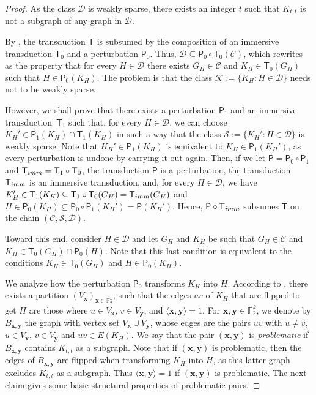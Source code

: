 \documentclass[10pt,a4paper]{amsart}
\newcommand{\Cc}{\mathscr{C}}
\newcommand{\Dd}{\mathscr{D}}
\newcommand{\Ss}{\mathscr{S}}
\begin{document}
\begin{proof}
	As the class $\Dd$ is weakly sparse, there exists an integer $t$ such that $K_{t,t}$ is not a subgraph of any graph in $\Dd$.
	
	By , the transduction $\mathsf T$ is subsumed by the composition of an immersive transduction $\mathsf T_0$ and a perturbation $\mathsf P_0$.
	Thus, $\Dd\subseteq \mathsf P_0\circ\mathsf T_0(\Cc)$, which rewrites as the property that for every $H\in\Dd$ there exists $G_H\in\Cc$ and $K_H\in\mathsf T_0(G_H)$ such that
	$H\in \mathsf P_0(K_H)$. 
	The problem is that the class $\mathscr K:=\{K_H\colon H\in\Dd\}$ needs not to be weakly sparse.
	
	However, we shall prove that there exists a perturbation $\mathsf P_1$ and an immersive transduction~$\mathsf T_1$ such that, for every $H\in\Dd$, we can choose 
	$K_H'\in\mathsf P_1(K_H)\cap \mathsf T_1(K_H)$ in such a way that the class 
	$\Ss:=\{K_H'\colon H\in\Dd\}$ is weakly sparse.
	Note that $K_H'\in\mathsf P_1(K_H)$ is equivalent to $K_H\in\mathsf P_1(K_H')$, as every perturbation is undone by carrying it out again.
	Then, if we let $\mathsf P=\mathsf P_0\circ\mathsf P_1$ and $\mathsf T_{\rm imm}=\mathsf T_1\circ\mathsf T_0$, the transduction $\mathsf P$ is a perturbation, 
	the transduction $\mathsf T_{\rm imm}$ is an immersive transduction, and, for every $H\in\Dd$, we have
	$K_H'\in \mathsf T_1(K_H)\subseteq \mathsf T_1\circ\mathsf T_0(G_H)=\mathsf T_{\rm imm}(G_H)$ and
	$H\in \mathsf P_0(K_H)\subseteq \mathsf P_0\circ\mathsf P_1(K_H')=\mathsf P(K_H')$.
	Hence, $\mathsf P\circ\mathsf T_{\rm imm}$ subsumes $\mathsf T$ on the chain $(\Cc,\Ss,\Dd)$.
	
	Toward this end, consider  $H\in\Dd$ and let $G_H$ and $K_H$ be such that $G_H\in\Cc$ and 
	$K_H\in\mathsf{T}_0(G_H)\cap\mathsf P_0(H)$.
	Note that this last condition is equivalent to the conditions  
	$K_H\in\mathsf T_0(G_H)$ and $H\in\mathsf P_0(K_H)$.
	
	We analyze how the perturbation $\mathsf P_0$ transforms $K_H$ into $H$.
	According to , there exists a partition $(V_{\mathbf x})_{\mathbf x\in\mathbb F_2^k}$, such that the edges $uv$ of $K_H$ that are flipped to get $H$ are those where $u\in V_{\mathbf x}$, $v\in V_{\mathbf y}$, and $\langle\mathbf{x},\mathbf{y}\rangle=1$.
	For $\mathbf x,\mathbf y\in\mathbb{F}_2^k$, we denote by $B_{\mathbf x,\mathbf y}$ the graph with vertex set $V_{\mathbf x}\cup V_{\mathbf y}$, whose edges are the pairs $uv$ with $u\neq v$, $u\in V_{\mathbf x}$, $v\in V_{\mathbf y}$ and $uv\in E(K_H)$. We say that the pair $(\mathbf x,\mathbf y)$ is \emph{problematic} if $B_{\mathbf x,\mathbf y}$ contains $K_{t,t}$ as a subgraph. Note that if $(\mathbf x,\mathbf y)$ is problematic, then the edges of $B_{\mathbf x,\mathbf y}$  are flipped when transforming $K_H$ into $H$, as this latter graph excludes $K_{t,t}$ as a subgraph. Thus $\langle\mathbf{x},\mathbf{y}\rangle=1$ if $(\mathbf x,\mathbf y)$ is problematic.
	The next claim gives some basic structural properties of problematic pairs.
	

\end{proof}
\end{document}
